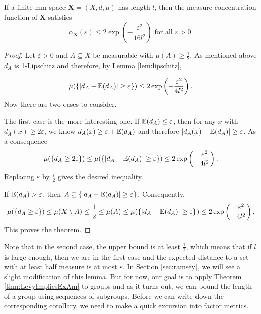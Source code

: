\begin{theorem}\label{thm:measureConcetration}
	If a finite mm-space $\boldsymbol{X}=(X,d,\mu)$ has length $l$, then the measure concentration function of $\boldsymbol X$ satisfies
	\[\alpha_{\boldsymbol{X}}(\varepsilon)\leq 2\exp\left(-\frac{\varepsilon^2}{16l^2}\right)\text{ for all $\varepsilon>0$}.\]
\end{theorem}
\begin{proof}
	Let $\varepsilon>0$ and $A\subseteq X$ be measurable with $\mu(A)\geq\frac{1}{2}$. As mentioned above $d_A$ is 1-Lipschitz and therefore, by Lemma \ref{lem:lipschitz},
				
	\[\mu(\{|d_A-\mathbb{E}(d_A)|\geq\varepsilon\})\leq 2\exp\left(-\frac{\varepsilon^2}{4l^2}\right).\]
	Now there are two cases to consider.
	
	The first case is the more interesting one.			
	If $\mathbb{E}(d_A)\leq\varepsilon$, then for any $x$ with $d_A(x)\geq2\varepsilon$, we know $d_A(x)\geq \varepsilon+\mathbb{E}(d_A)$ and therefore $|d_A(x)-\mathbb{E}(d_A)|\geq \varepsilon$. As a consequence %
	\[\mu(\{d_A\geq2\varepsilon\})\leq \mu(\{|d_A-\mathbb{E}(d_A)|\geq\varepsilon\})\leq2\exp\left(-\frac{\varepsilon^2}{4l^2}\right) .\]
	Replacing $\varepsilon$ by $\frac{\varepsilon}{2}$ gives the desired inequality.
				
	If $\mathbb{E}(d_A)>\varepsilon$, then $A\subseteq \{|d_A-\mathbb{E}(d_A)|\geq\varepsilon\}$. Consequently,
	\[\mu(\{d_A\geq\varepsilon\})\leq \mu(X\setminus A)\leq \frac{1}{2}\leq \mu(A)\leq \mu(\{|d_A-\mathbb{E}(d_A)|\geq\varepsilon\})\leq 2\exp\left(-\frac{\varepsilon^2}{4l^2}\right).\]
	This proves the theorem.
\end{proof}
Note that in the second case, the upper bound is at least $\frac{1}{2}$, which means that if $l$ is large enough, then we are in the first case and the expected distance to a set with at least half measure is at most $\varepsilon$. In Section \ref{sec:ramsey}, we will see a slight modification of this lemma.
But for now, our goal is to apply Theorem \ref{thm:LevyImpliesExAm} to groups and as it turns out, we can bound the length of a group using sequences of subgroups. Before we can write down the corresponding corollary, we need to make a quick excursion into factor metrics. 
		
